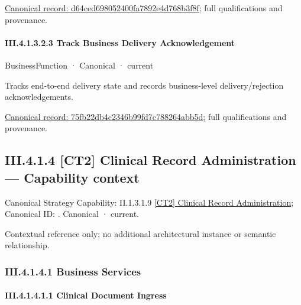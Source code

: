 {\footnotesize \href{../../../../../../../continuum/business/business-function/d64ced698052400fa7892e4d768b3f8f.md}{Canonical record: d64ced698052400fa7892e4d768b3f8f}; full qualifications and provenance.}\par
\paragraph*{III.4.1.3.2.3 Track Business Delivery Acknowledgement}
\label{navigation:III.4.1.3.2.3}

\label{element:75fb22db4c2346b99fd7c788264abb5d}
{\small BusinessFunction · Canonical · current}\par

Tracks end-to-end delivery state and records business-level delivery/rejection acknowledgements.


{\footnotesize \href{../../../../../../../continuum/business/business-function/75fb22db4c2346b99fd7c788264abb5d.md}{Canonical record: 75fb22db4c2346b99fd7c788264abb5d}; full qualifications and provenance.}\par
\subsection*{III.4.1.4 [CT2] Clinical Record Administration — Capability context}
\label{navigation:III.4.1.4}

{\small Canonical Strategy Capability: II.1.3.1.9 \hyperref[element:ce9e7e7b22054cefb707a650d5be7219]{[CT2] Clinical Record Administration}; Canonical ID: \texttt{}. Canonical · current.}\par
Contextual reference only; no additional architectural instance or semantic relationship.\par
\subsubsection*{III.4.1.4.1 Business Services}
\label{navigation:III.4.1.4.1}

\paragraph*{III.4.1.4.1.1 Clinical Document Ingress}
\label{navigation:III.4.1.4.1.1}


